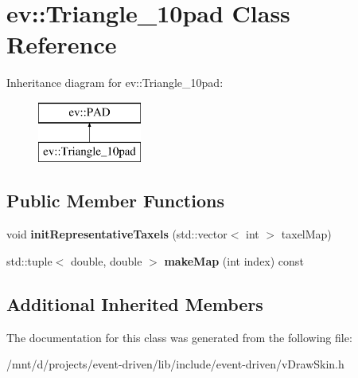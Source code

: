 \hypertarget{classev_1_1Triangle__10pad}{}\section{ev\+:\+:Triangle\+\_\+10pad Class Reference}
\label{classev_1_1Triangle__10pad}
Inheritance diagram for ev\+:\+:Triangle\+\_\+10pad\+:\begin{figure}[H]
\begin{center}
\leavevmode
\includegraphics[height=2.000000cm]{classev_1_1Triangle__10pad}
\end{center}
\end{figure}
\subsection*{Public Member Functions}
\begin{DoxyCompactItemize}
\item 
\mbox{\label{classev_1_1Triangle__10pad_a6b93724fa95d5c505ba997b661288d82}} 
void {\bfseries init\+Representative\+Taxels} (std\+::vector$<$ int $>$ taxel\+Map)
\item 
\mbox{\label{classev_1_1Triangle__10pad_a2da9dce32afeea094937a67d0585be9d}} 
std\+::tuple$<$ double, double $>$ {\bfseries make\+Map} (int index) const
\end{DoxyCompactItemize}
\subsection*{Additional Inherited Members}


The documentation for this class was generated from the following file\+:\begin{DoxyCompactItemize}
\item 
/mnt/d/projects/event-\/driven/lib/include/event-\/driven/v\+Draw\+Skin.\+h\end{DoxyCompactItemize}

